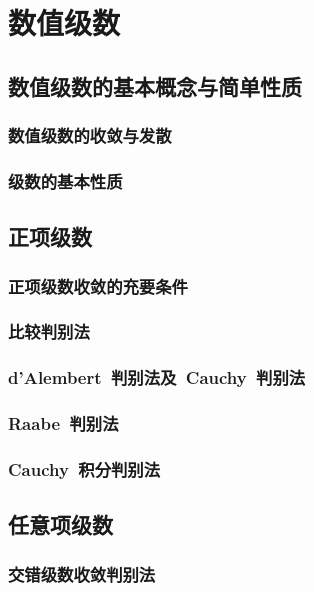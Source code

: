 

\chapter{数值级数}\label{ch:11}
\section{数值级数的基本概念与简单性质}
\subsection{数值级数的收敛与发散}
\subsection{级数的基本性质}
\begin{exercise}

\end{exercise}
\section{正项级数}
\subsection{正项级数收敛的充要条件}
\subsection{比较判别法}
\subsection{d'Alembert~判别法及~Cauchy~判别法}
\subsection{Raabe~判别法}
\subsection{Cauchy~积分判别法}
\begin{exercise}

\end{exercise}
\section{任意项级数}
\subsection{交错级数收敛判别法}
